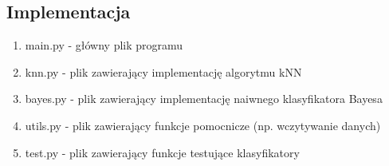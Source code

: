\documentclass[12pt,a4paper]{article}
\begin{document}
\subsection{Implementacja}
\begin{enumerate}
	\item main.py - główny plik programu
	\item knn.py - plik zawierający implementację algorytmu kNN
	\item bayes.py - plik zawierający implementację naiwnego klasyfikatora Bayesa
	\item utils.py - plik zawierający funkcje pomocnicze (np. wczytywanie danych)
	\item test.py - plik zawierający funkcje testujące klasyfikatory
\end{enumerate}
\end{document}
